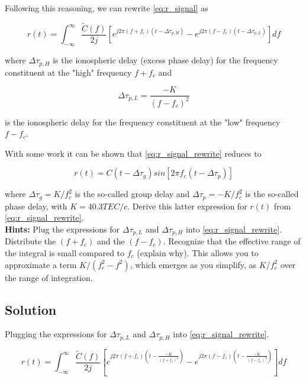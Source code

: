 Following this reasoning, we can rewrite \ref{eq:r_signal} as

\begin{equation}
	r(t) = \int_{-\infty}^{\infty} \frac{\tilde{C}(f)}{2j}
	[ e^{j 2 \pi (f + f_c) (t - \Delta \tau_{p,H})}
		- e^{j 2 \pi (f - f_c) (t - \Delta \tau_{p,L})}] df
	\label{eq:r_signal_rewrite}
\end{equation}

where $\Delta \tau_{p,H}$ is the ionospheric delay (excess phase delay) for the
frequency constituent at the "high" frequency $f + f_c$ and

\begin{equation}
	\Delta \tau_{p,L} = \frac{-K}{(f - f_c)^2}
\end{equation}

is the ionospheric delay for the frequency constituent at the "low" frequency
$f - f_c$.

With some work it can be shown that \ref{eq:r_signal_rewrite} reduces to

\begin{equation}
	r(t) = C(t- \Delta\tau_g) sin[2 \pi f_c (t-\Delta\tau_p)]
\end{equation}

where $\Delta\tau_g = K/f_c^2$ is the so-called group delay and
$\Delta\tau_p = -K/f_c^2$ is the so-called phase delay, with $K=40.3 TEC/c$.
Derive this latter expression for $r(t)$ from \ref{eq:r_signal_rewrite}.\\

\textbf{Hints:} Plug the expressions for $\Delta \tau_{p,L}$ and $\Delta \tau_{p,H}$ into
\ref{eq:r_signal_rewrite}. Distribute the $(f+f_c)$ and the $(f-f_c)$. Recognize
that the effective range of the integral is small compared to $f_c$ (explain why).
This allows you to approximate a term $K/(f_c^2-f^2)$, which emerges as you
simplify, as $K/f_c^2$ over the range of integration.

\subsection{Solution}

Plugging the expressions for $\Delta \tau_{p,L}$ and $\Delta \tau_{p,H}$ into
\ref{eq:r_signal_rewrite}.

\begin{equation*}
	r(t) = \int_{-\infty}^{\infty} \frac{\tilde{C}(f)}{2j}
	[ e^{j 2 \pi (f + f_c) (t - \frac{-K}{(f + f_c)^2})}
		- e^{j 2 \pi (f - f_c) (t - \frac{-K}{(f - f_c)^2})}] df
\end{equation*}

